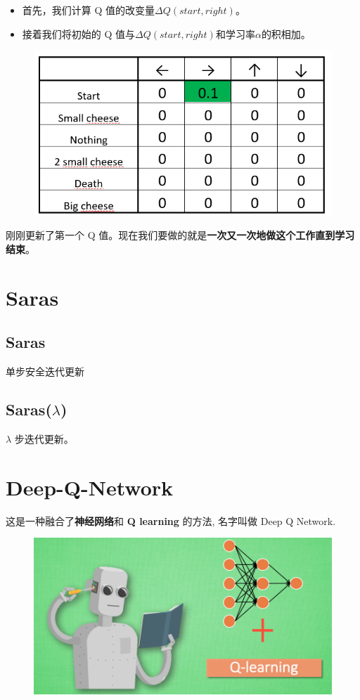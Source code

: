 \documentclass[UTF8,a4paper,12pt]{ctexbook}
\begin{document}
				\begin{itemize}
					\item 首先，我们计算 Q 值的改变量$\Delta Q(start, right)$。
					\item 接着我们将初始的 Q 值与$\Delta Q(start, right)$和学习率$\alpha$的积相加。
				\end{itemize}
				
				\begin{figure}[H]
					\centering
					\includegraphics[width=.7\linewidth]{qExample06}
				\end{figure}
				
				刚刚更新了第一个 Q 值。现在我们要做的就是\textbf{一次又一次地做这个工作直到学习结束}。		
		
	\section{Saras}
		\subsection{Saras}
			单步安全迭代更新
		
		\subsection{Saras($\lambda$)}
			$\lambda$ 步迭代更新。
	
	\section{Deep-Q-Network}
		这是一种融合了\textbf{神经网络}和 \textbf{Q learning} 的方法, 名字叫做 Deep Q Network.
			\begin{figure}[H]
				\centering
				\includegraphics[width=.9\linewidth]{DQN1}
			\end{figure}
		
\end{document}
